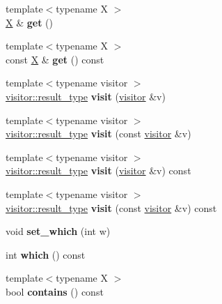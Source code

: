 \begin{DoxyCompactItemize}
\item 
\mbox{\label{classfc_1_1static__variant_a47dc4304b6e9ff54034d52a45acd8426}} 
{\footnotesize template$<$typename X $>$ }\\\mbox{\hyperlink{class_x}{X}} \& {\bfseries get} ()
\item 
\mbox{\label{classfc_1_1static__variant_a05ab60d9c3ccc3fedd5f7b608eb49e64}} 
{\footnotesize template$<$typename X $>$ }\\const \mbox{\hyperlink{class_x}{X}} \& {\bfseries get} () const
\item 
\mbox{\label{classfc_1_1static__variant_a925e65f1cb62cb92e017aa720b66697a}} 
{\footnotesize template$<$typename visitor $>$ }\\\mbox{\hyperlink{struct_result}{visitor\+::result\+\_\+type}} {\bfseries visit} (\mbox{\hyperlink{structfc_1_1visitor}{visitor}} \&v)
\item 
\mbox{\label{classfc_1_1static__variant_ada2479eb3f11e2067bb81766864faede}} 
{\footnotesize template$<$typename visitor $>$ }\\\mbox{\hyperlink{struct_result}{visitor\+::result\+\_\+type}} {\bfseries visit} (const \mbox{\hyperlink{structfc_1_1visitor}{visitor}} \&v)
\item 
\mbox{\label{classfc_1_1static__variant_ab55fdf4f0a8aa9959af125b8b857fd6d}} 
{\footnotesize template$<$typename visitor $>$ }\\\mbox{\hyperlink{struct_result}{visitor\+::result\+\_\+type}} {\bfseries visit} (\mbox{\hyperlink{structfc_1_1visitor}{visitor}} \&v) const
\item 
\mbox{\label{classfc_1_1static__variant_a1a26a7e9eea0491e7e4d8a0eaf049c31}} 
{\footnotesize template$<$typename visitor $>$ }\\\mbox{\hyperlink{struct_result}{visitor\+::result\+\_\+type}} {\bfseries visit} (const \mbox{\hyperlink{structfc_1_1visitor}{visitor}} \&v) const
\item 
\mbox{\label{classfc_1_1static__variant_a9b67f847b35b352f00a6c8ecbcb9d61b}} 
void {\bfseries set\+\_\+which} (int w)
\item 
\mbox{\label{classfc_1_1static__variant_adde9b63f32037451462624d49e31c12e}} 
int {\bfseries which} () const
\item 
\mbox{\label{classfc_1_1static__variant_aa0130c017cb611c085fbd79f913f8523}} 
{\footnotesize template$<$typename X $>$ }\\bool {\bfseries contains} () const
\end{DoxyCompactItemize}
